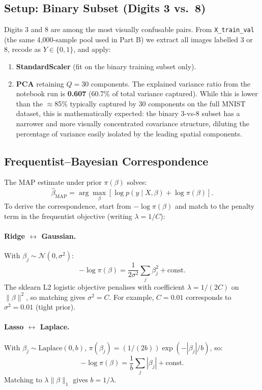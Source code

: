 \documentclass[10pt, letterpaper]{article}
\begin{document}
\subsection{Setup: Binary Subset (Digits 3 vs.\ 8)}
Digits 3 and 8 are among the most visually confusable pairs. From \texttt{X\_train\_val} (the same 4{,}000-sample pool used in Part B) we extract all images labelled 3 or 8, recode as $Y \in \{0, 1\}$, and apply:
\begin{enumerate}
\item \textbf{StandardScaler} (fit on the binary training subset only).
\item \textbf{PCA} retaining $Q = 30$ components. The explained variance ratio from the notebook run is \textbf{0.607} (60.7\% of total variance captured). While this is lower than the $\approx$85\% typically captured by 30 components on the full MNIST dataset, this is mathematically expected: the binary 3-vs-8 subset has a narrower and more visually concentrated covariance structure, diluting the percentage of variance easily isolated by the leading spatial components.
\end{enumerate}

\subsection{Frequentist--Bayesian Correspondence}
The MAP estimate under prior $\pi(\beta)$ solves:
\[
\hat{\beta}_{\text{MAP}} = \arg\max_\beta \left[ \log p(y \mid X, \beta) + \log \pi(\beta) \right].
\]
To derive the correspondence, start from $-\log \pi(\beta)$ and match to the penalty term in the frequentist objective (writing $\lambda = 1/C$):

\paragraph{Ridge $\leftrightarrow$ Gaussian.} With $\beta_j \sim \mathcal{N}(0, \sigma^2)$:
\[
-\log \pi(\beta) = \frac{1}{2\sigma^2} \sum_j \beta_j^2 + \text{const}.
\]
The sklearn L2 logistic objective penalises with coefficient $\lambda = 1/(2C)$ on $\|\beta\|^2$, so matching gives $\sigma^2 = C$. For example, $C = 0.01$ corresponds to $\sigma^2 = 0.01$ (tight prior).

\paragraph{Lasso $\leftrightarrow$ Laplace.} With $\beta_j \sim \text{Laplace}(0, b)$, $\pi(\beta_j) = (1/(2b)) \exp(-|\beta_j|/b)$, so:
\[
-\log \pi(\beta) = \frac{1}{b} \sum_j |\beta_j| + \text{const}.
\]
Matching to $\lambda \|\beta\|_1$ gives $b = 1/\lambda$.
\end{document}
